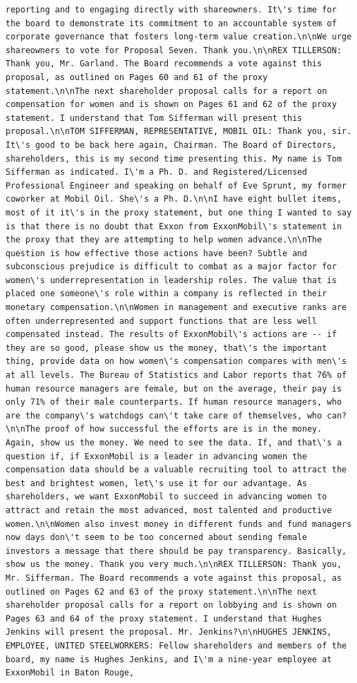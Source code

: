 \documentclass[
  letterpaper,
  DIV=11,
  numbers=noendperiod]{scrreprt}
\begin{document}
\begin{verbatim}
reporting and to engaging directly with shareowners. It\'s time for the board to demonstrate its commitment to an accountable system of corporate governance that fosters long-term value creation.\n\nWe urge shareowners to vote for Proposal Seven. Thank you.\n\nREX TILLERSON: Thank you, Mr. Garland. The Board recommends a vote against this proposal, as outlined on Pages 60 and 61 of the proxy statement.\n\nThe next shareholder proposal calls for a report on compensation for women and is shown on Pages 61 and 62 of the proxy statement. I understand that Tom Sifferman will present this proposal.\n\nTOM SIFFERMAN, REPRESENTATIVE, MOBIL OIL: Thank you, sir. It\'s good to be back here again, Chairman. The Board of Directors, shareholders, this is my second time presenting this. My name is Tom Sifferman as indicated. I\'m a Ph. D. and Registered/Licensed Professional Engineer and speaking on behalf of Eve Sprunt, my former coworker at Mobil Oil. She\'s a Ph. D.\n\nI have eight bullet items, most of it it\'s in the proxy statement, but one thing I wanted to say is that there is no doubt that Exxon from ExxonMobil\'s statement in the proxy that they are attempting to help women advance.\n\nThe question is how effective those actions have been? Subtle and subconscious prejudice is difficult to combat as a major factor for women\'s underrepresentation in leadership roles. The value that is placed one someone\'s role within a company is reflected in their monetary compensation.\n\nWomen in management and executive ranks are often underrepresented and support functions that are less well compensated instead. The results of ExxonMobil\'s actions are -- if they are so good, please show us the money, that\'s the important thing, provide data on how women\'s compensation compares with men\'s at all levels. The Bureau of Statistics and Labor reports that 76% of human resource managers are female, but on the average, their pay is only 71% of their male counterparts. If human resource managers, who are the company\'s watchdogs can\'t take care of themselves, who can?\n\nThe proof of how successful the efforts are is in the money. Again, show us the money. We need to see the data. If, and that\'s a question if, if ExxonMobil is a leader in advancing women the compensation data should be a valuable recruiting tool to attract the best and brightest women, let\'s use it for our advantage. As shareholders, we want ExxonMobil to succeed in advancing women to attract and retain the most advanced, most talented and productive women.\n\nWomen also invest money in different funds and fund managers now days don\'t seem to be too concerned about sending female investors a message that there should be pay transparency. Basically, show us the money. Thank you very much.\n\nREX TILLERSON: Thank you, Mr. Sifferman. The Board recommends a vote against this proposal, as outlined on Pages 62 and 63 of the proxy statement.\n\nThe next shareholder proposal calls for a report on lobbying and is shown on Pages 63 and 64 of the proxy statement. I understand that Hughes Jenkins will present the proposal. Mr. Jenkins?\n\nHUGHES JENKINS, EMPLOYEE, UNITED STEELWORKERS: Fellow shareholders and members of the board, my name is Hughes Jenkins, and I\'m a nine-year employee at ExxonMobil in Baton Rouge, 
\end{verbatim}
\end{document}
